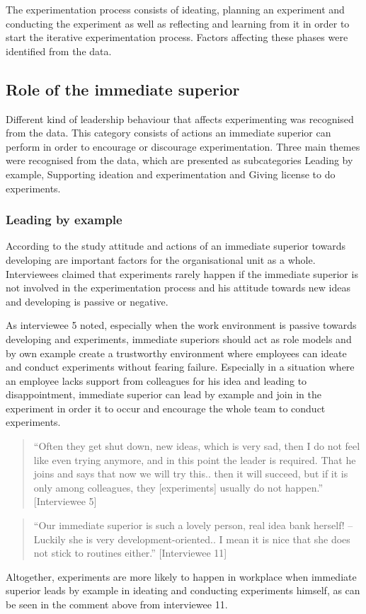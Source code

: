 The experimentation process consists of ideating, planning an experiment and conducting the experiment as well as reflecting and learning from it in order to start the iterative experimentation process. Factors affecting these phases were identified from the data. 

\subsection{Role of the immediate superior}
Different kind of leadership behaviour that affects experimenting was recognised from the data. This category consists of actions an immediate superior can perform in order to encourage or discourage experimentation. Three main themes were recognised from the data, which are presented as subcategories Leading by example, Supporting ideation and experimentation and Giving license to do experiments.

\subsubsection{Leading by example}

According to the study attitude and actions of an immediate superior towards developing are important factors for the organisational unit as a whole. Interviewees claimed that experiments rarely happen if the immediate superior is not involved in the experimentation process and his attitude towards new ideas and developing is passive or negative. 

As interviewee 5 noted, especially when the work environment is passive towards developing and experiments, immediate superiors should act as role models and by own example create a trustworthy environment where employees can ideate and conduct experiments without fearing failure. Especially in a situation where an employee lacks support from colleagues for his idea and leading to disappointment, immediate superior can lead by example and join in the experiment in order it to occur and encourage the whole team to conduct experiments.
   
\begin{quote}
``Often they get shut down, new ideas, which is very sad, then I do not feel like even trying anymore, and in this point the leader is required. That he joins and says that now we will try this.. then it will succeed, but if it is only among colleagues, they [experiments] usually do not happen.'' [Interviewee 5]
\end{quote}
\begin{quote}
 ``Our immediate superior is such a lovely person, real idea bank herself! -- Luckily she is very development-oriented.. I mean it is nice that she does not stick to routines either.'' [Interviewee 11]
\end{quote}
Altogether, experiments are more likely to happen in workplace when immediate superior leads by example in ideating and conducting experiments himself, as can be seen in the comment above from interviewee 11.

